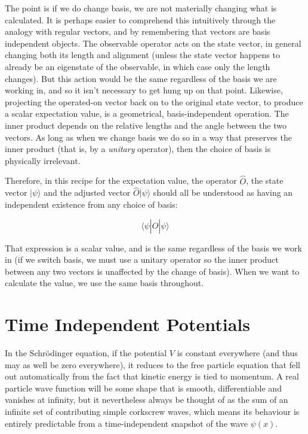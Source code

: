 The point is if we do change basis, we are not materially changing what is calculated. It is perhaps easier to comprehend this intuitively through the analogy with regular vectors, and by remembering that vectors are basis independent objects. The observable operator acts on the state vector, in general changing both its length and alignment (unless the state vector happens to already be an eigenstate of the observable, in which case only the length changes). But this action would be the same regardless of the basis we are working in, and so it isn't necessary to get hung up on that point. Likewise, projecting the operated-on vector back on to the original state vector, to produce a scalar expectation value, is a geometrical, basis-independent operation. The inner product depends on the relative lengths and the angle between the two vectors. As long as when we change basis we do so in a way that preserves the inner product (that is, by a \textit{unitary} operator), then the choice of basis is physically irrelevant. 

Therefore, in this recipe for the expectation value, the operator $\hat{O}$, the state vector $| \psi \rangle$ and the adjusted vector $\hat{O} | \psi \rangle$ should all be understood as having an independent existence from any choice of basis:

$$
\langle \psi| \hat{O} | \psi \rangle
$$

That expression is a scalar value, and is the same regardless of the basis we work in (if we switch basis, we must use a unitary operator so the inner product between any two vectors is unaffected by the change of basis). When we want to calculate the value, we use the same basis throughout.

\section{Time Independent Potentials}

In the Schrödinger equation, if the potential $V$ is constant everywhere (and thus may as well be zero everywhere), it reduces to the free particle equation that fell out automatically from the fact that kinetic energy is tied to momentum. A real particle wave function will be some shape that is smooth, differentiable and vanishes at infinity, but it nevertheless always be thought of as the sum of an infinite set of contributing simple corkscrew waves, which means its behaviour is entirely predictable from a time-independent snapshot of the wave $\psi(x)$.

